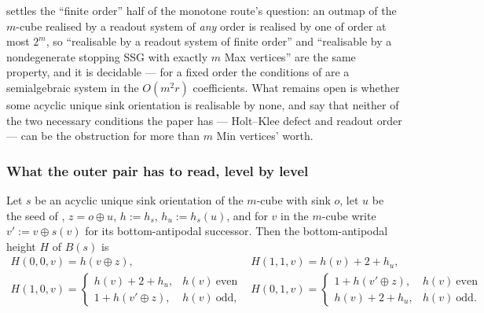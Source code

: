 \begin{remark}\label{lvl:finite-order}
 settles the ``finite order'' half of the monotone route's
question: an outmap of the $m$-cube realised by a readout system of \emph{any}
order is realised by one of order at most $2^{m}$, so ``realisable by a readout
system of finite order'' and ``realisable by a nondegenerate stopping SSG with
exactly $m$ Max vertices'' are the same property, and it is decidable --- for a
fixed order the conditions of  are a semialgebraic
system in the $O(m^{2}r)$ coefficients.  What remains open is whether some
acyclic unique sink orientation is realisable by none, and
 say that neither of the two necessary
conditions the paper has --- Holt--Klee defect and readout order --- can be the
obstruction for more than $m$ Min vertices' worth.
\end{remark}

\subsubsection*{What the outer pair has to read, level by level}

\begin{proposition}\label{lvl:parity-recursion}
Let $s$ be an acyclic unique sink orientation of the $m$-cube with sink $o$,
let $u$ be the seed of , $z=o\oplus u$, $h:=h_s$,
$h_u:=h_s(u)$, and for $v$ in the $m$-cube write $v':=v\oplus s(v)$ for its
bottom-antipodal successor.  Then the bottom-antipodal height $H$ of $B(s)$ is
\[
\begin{array}{ll}
 H(0,0,v)=h(v\oplus z), &
 H(1,1,v)=h(v)+2+h_u,\\[2pt]
 H(1,0,v)=\begin{cases} h(v)+2+h_u,& h(v)\ \text{even}\\
                        1+h(v'\oplus z),& h(v)\ \text{odd,}\end{cases} &
 H(0,1,v)=\begin{cases} 1+h(v'\oplus z),& h(v)\ \text{even}\\
                        h(v)+2+h_u,& h(v)\ \text{odd.}\end{cases}
\end{array}
\]
\end{proposition}


